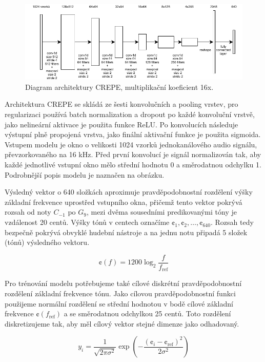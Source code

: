 \begin{figure}[h]\centering
\includegraphics[width=\textwidth,height=\textheight,keepaspectratio]{../img/crepe_arch}
\caption{Diagram architektury CREPE, multiplikační koeficient 16x.}
\label{obr:wavenet_dilated}
\end{figure}

Architektura CREPE se skládá ze šesti konvolučních a pooling vrstev, pro regularizaci používá batch normalization a dropout po každé konvoluční vrstvě, jako nelineární aktivace je použita funkce ReLU. Po konvolucích následuje výstupní plně propojená vrstva, jako finální aktivační funkce je použita sigmoida. Vstupem modelu je okno o velikosti 1024 vzorků jednokanálového audio signálu, převzorkovaného na 16 kHz. Před první konvolucí je signál normalizován tak, aby každé jednotlivé vstupní okno mělo střední hodnotu 0 a směrodatnou odchylku 1. Podrobnější popis modelu je naznačen na obrázku.

Výsledný vektor o 640 složkách aproximuje pravděpodobnostní rozdělení výšky základní frekvence uprostřed vstupního okna, přičemž tento vektor pokrývá rozsah od noty $C_{-1}$ po $G_{9}$, mezi dvěma sousedními predikovanými tóny je vzdálenost 20 centů. Výšky tónů v centech označíme $\cent_1, \cent_2, \dots, \cent_{640}$. Rozsah tedy bezpečně pokrývá obvyklé hudební nástroje a na jednu notu připadá 5 složek (tónů) výsledného vektoru.

    $$\cent(f) = 1200 \log_2{\frac{f}{f_{\mathrm{ref}}}}$$

Pro trénování modelu potřebujeme také cílové diskrétní pravděpodobnostní rozdělení základní frekvence tónu. Jako cílovou pravděpodobnostní funkci použijeme normální rozdělení se střední hodnotou v bodě cílové základní frekvence $\cent(f_{\mathrm{ref}})$ a se směrodatnou odchylkou 25 centů. Toto rozdělení diskretizujeme tak, aby měl cílový vektor stejné dimenze jako odhadovaný.

    $$y_i = \frac{1}{\sqrt{2 \pi \sigma^2}}\exp{(-\frac{(\cent_i - \cent_{\mathrm{ref}})^2}{2 \sigma^2})}$$

